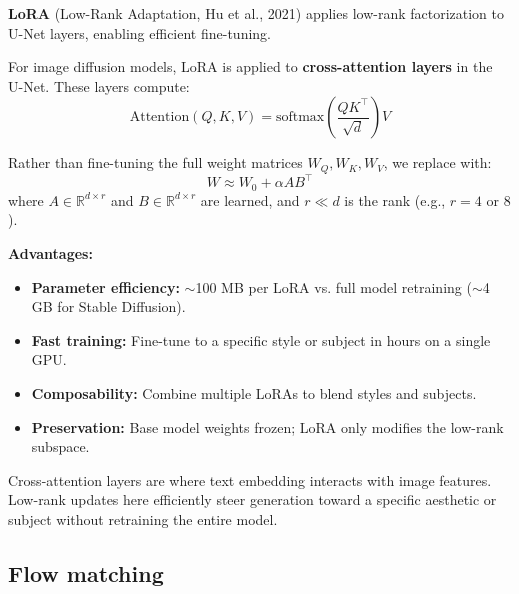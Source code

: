 \begin{paperbox}[title={LoRA for Image Models}]
\textbf{LoRA} (Low-Rank Adaptation, Hu et al., 2021) applies low-rank factorization to U-Net layers, enabling efficient fine-tuning.

For image diffusion models, LoRA is applied to \textbf{cross-attention layers} in the U-Net. These layers compute:
\[
\text{Attention}(Q, K, V) = \text{softmax}\left(\frac{QK^\top}{\sqrt{d}}\right) V
\]

Rather than fine-tuning the full weight matrices $W_Q, W_K, W_V$, we replace with:
\[
W \approx W_0 + \alpha A B^\top
\]
where $A \in \mathbb{R}^{d \times r}$ and $B \in \mathbb{R}^{d \times r}$ are learned, and $r \ll d$ is the rank (e.g., $r=4$ or $8$).

\textbf{Advantages:}
\begin{itemize}
  \item \textbf{Parameter efficiency:} $\sim$100 MB per LoRA vs. full model retraining ($\sim$4 GB for Stable Diffusion).
  \item \textbf{Fast training:} Fine-tune to a specific style or subject in hours on a single GPU.
  \item \textbf{Composability:} Combine multiple LoRAs to blend styles and subjects.
  \item \textbf{Preservation:} Base model weights frozen; LoRA only modifies the low-rank subspace.
\end{itemize}

\begin{intuitionbox}
Cross-attention layers are where text embedding interacts with image features. Low-rank updates here efficiently steer generation toward a specific aesthetic or subject without retraining the entire model.
\end{intuitionbox}
\end{paperbox}


\subsection{Flow matching}

